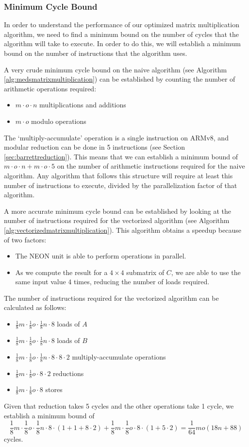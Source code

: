 \documentclass[11pt,a4paper]{report}
\theoremstyle{definition}
\begin{document}
\subsubsection{Minimum Cycle Bound}
In order to understand the performance of our optimized matrix multiplication algorithm, we need to find a minimum bound on the number of cycles that the algorithm will take to execute. In order to do this, we will establish a minimum bound on the number of instructions that the algorithm uses.

A very crude minimum cycle bound on the naive algorithm (see Algorithm \ref{alg:medsmatrixmultiplication}) can be established by counting the number of arithmetic operations required:
\begin{itemize}
  \item $m \cdot o \cdot n$ multiplications and additions
  \item $m \cdot o$ modulo operations
\end{itemize}
The `multiply-accumulate' operation is a single instruction on ARMv8, and modular reduction can be done in 5 instructions (see Section \ref{sec:barrettreduction}). This means that we can establish a minimum bound of $m \cdot o \cdot n + m \cdot o \cdot 5$ on the number of arithmetic instructions required for the naive algorithm. Any algorithm that follows this structure will require at least this number of instructions to execute, divided by the parallelization factor of that algorithm.

A more accurate minimum cycle bound can be established by looking at the number of instructions required for the vectorized algorithm (see Algorithm \ref{alg:vectorizedmatrixmultiplication}). This algorithm obtains a speedup because of two factors:
\begin{itemize}
  \item The NEON unit is able to perform operations in parallel.
  \item As we compute the result for a $4\times4$ submatrix of $C$, we are able to use the same input value 4 times, reducing the number of loads required.
\end{itemize}
The number of instructions required for the vectorized algorithm can be calculated as follows:
\begin{itemize}
  \item $\frac{1}{8}m \cdot \frac{1}{8}o \cdot \frac{1}{8}n \cdot 8$ loads of $A$
  \item $\frac{1}{8}m \cdot \frac{1}{8}o \cdot \frac{1}{8}n \cdot 8$ loads of $B$
  \item $\frac{1}{8}m \cdot \frac{1}{8}o \cdot \frac{1}{8}n \cdot 8 \cdot 8 \cdot 2$ multiply-accumulate operations
  \item $\frac{1}{8}m \cdot \frac{1}{8}o \cdot 8 \cdot 2$ reductions
  \item $\frac{1}{8}m \cdot \frac{1}{8}o \cdot 8$ stores
\end{itemize}
Given that reduction takes 5 cycles and the other operations take 1 cycle, we establish a minimum bound of 
\[
  \frac{1}{8}m \cdot \frac{1}{8}o \cdot \frac{1}{8}n \cdot 8 \cdot (1 + 1 + 8 \cdot 2) + \frac{1}{8}m \cdot \frac{1}{8}o \cdot 8 \cdot (1 + 5 \cdot 2) = \frac{1}{64}mo(18n + 88)
\]
cycles.
\end{document}
